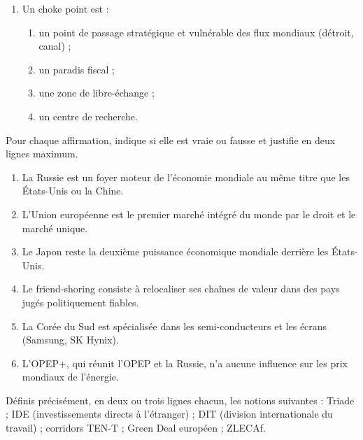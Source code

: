 \documentclass[11pt]{article}
\newcommand{\cle}[1]{{\popxbold\color{popdark}#1}}
\begin{document}
\begin{exercice}
\begin{enumerate}
\begin{enumerate}
\end{enumerate}
\item Un \cle{choke point} est :
\begin{enumerate}
\item un point de passage stratégique et vulnérable des flux mondiaux (détroit, canal) ;
\item un paradis fiscal ;
\item une zone de libre-échange ;
\item un centre de recherche.
\end{enumerate}
\end{enumerate}
\end{exercice}

\begin{exercice}
Pour chaque affirmation, indique si elle est vraie ou fausse et justifie en deux lignes maximum.
\begin{enumerate}
\item La Russie est un foyer moteur de l'économie mondiale au même titre que les États-Unis ou la Chine.
\item L'Union européenne est le premier marché intégré du monde par le droit et le marché unique.
\item Le Japon reste la deuxième puissance économique mondiale derrière les États-Unis.
\item Le \cle{friend-shoring} consiste à relocaliser ses chaînes de valeur dans des pays jugés politiquement fiables.
\item La Corée du Sud est spécialisée dans les semi-conducteurs et les écrans (Samsung, SK Hynix).
\item L'OPEP+, qui réunit l'OPEP et la Russie, n'a aucune influence sur les prix mondiaux de l'énergie.
\end{enumerate}
\end{exercice}

\begin{exercice}
Définis précisément, en deux ou trois lignes chacun, les notions suivantes : \cle{Triade} ; \cle{IDE} (investissements directs à l'étranger) ; \cle{DIT} (division internationale du travail) ; \cle{corridors TEN-T} ; \cle{Green Deal} européen ; \cle{ZLECAf}.
\end{exercice}
\end{document}
